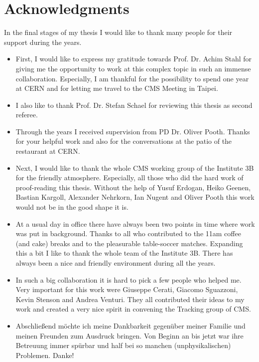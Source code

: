 \chapter*{Acknowledgments}

In the final stages of my thesis I would like to thank many people for their support during the years.

\begin{itemize}

\item{} First, I would like to express my gratitude towards Prof. Dr. Achim Stahl for giving me the opportunity to work at this complex topic in such an immense collaboration. Especially, I am thankful for the possibility to spend one year at CERN and for letting me travel to the CMS Meeting in Taipei.

\item{} I also like to thank Prof. Dr. Stefan Schael for reviewing this thesis as second referee.

\item{} Through the years I received supervision from PD Dr. Oliver Pooth. Thanks for your helpful work and also for the conversations at the patio of the restaurant at CERN.

\item{} Next, I would like to thank the whole CMS working group of the Institute 3B for the friendly atmosphere. Especially, all those who did the hard work of proof-reading this thesis. Without the help of Yusuf Erdogan, Heiko Geenen, Bastian Kargoll, Alexander Nehrkorn, Ian Nugent and Oliver Pooth this work would not be in the good shape it is.

\item{} At a usual day in office there have always been two points in time where work was put in background. Thanks to all who contributed to the 11am coffee (and cake) breaks and to the pleasurable table-soccer matches. Expanding this a bit I like to thank the whole team of the Institute 3B. There has always been a nice and friendly environment during all the years.

\item{} In such a big collaboration it is hard to pick a few people who helped me. Very important for this work were Giuseppe Cerati, Giacomo Sguazzoni, Kevin Stenson and Andrea Venturi. They all contributed their ideas to my work and created a very nice spirit in convening the Tracking group of CMS.



\item{} Abschlie\ss{}end m\"o{}chte ich meine Dankbarkeit gegen\"u{}ber meiner Familie und meinen Freunden zum Ausdruck bringen. Von Beginn an bis jetzt war ihre Betreuung immer sp\"u{}rbar und half bei so manchen (unphysikalischen) Problemen. Danke!


\end{itemize}